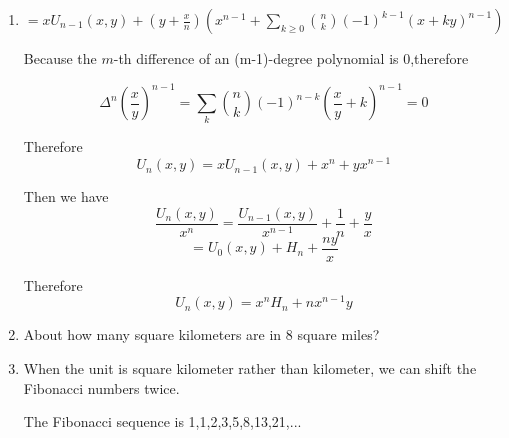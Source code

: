 \documentclass[12pt,a4paper]{article}
\makeatletter
\newtheorem*{solution}{Solution}
\theoremstyle{definition}
\renewenvironment{solution}[1][Solution] {\par\pushQED{\qed}\normalfont\topsep6\p@\@plus6\p@\relax\trivlist\item[\hskip\labelsep\bfseries#1\@addpunct{.}]\ignorespaces}{\popQED\endtrivlist\@endpefalse} \makeatother
\makeatother
\begin{document}
\begin{enumerate}
\begin{solution}
        	$=xU_{n-1}(x,y)+(y+\frac{x}{n})(x^{n-1}+\sum_{k \ge 0}\binom{n}{k}(-1)^{k-1}(x+ky)^{n-1})$
        	
        	Because the $m$-th difference of an (m-1)-degree polynomial is 0,therefore
        	
            \begin{equation*}
                \Delta^n(\frac{x}{y})^{n-1}=\sum_{k} \binom{n}{k} (-1)^{n-k} (\frac{x}{y}+k)^{n-1}=0
            \end{equation*}
            
            Therefore 
            \begin{equation*}
                U_n(x,y)=xU_{n-1}(x,y)+x^n+yx^{n-1}
            \end{equation*}
            
            Then we have
            \begin{equation*}
                \frac{U_n(x,y)}{x^n}=\frac{U_{n-1}(x,y)}{x^{n-1}}+\frac{1}{n}+\frac{y}{x} 
            \end{equation*}
            \begin{equation*}
                =U_0(x,y)+H_n+\frac{ny}{x} 
            \end{equation*}
            
            Therefore 
            \begin{equation*}
                U_n(x,y)=x^nH_n+nx^{n-1}y
            \end{equation*}
        \end{solution}
    \item 
        About how many square kilometers are in 8 square miles?
        \begin{solution}
        	When the unit is square kilometer rather than kilometer, we can shift the Fibonacci numbers twice.
        	
        	The Fibonacci sequence is 1,1,2,3,5,8,13,21,...
        	

\end{solution}
\end{enumerate}
\end{document}
